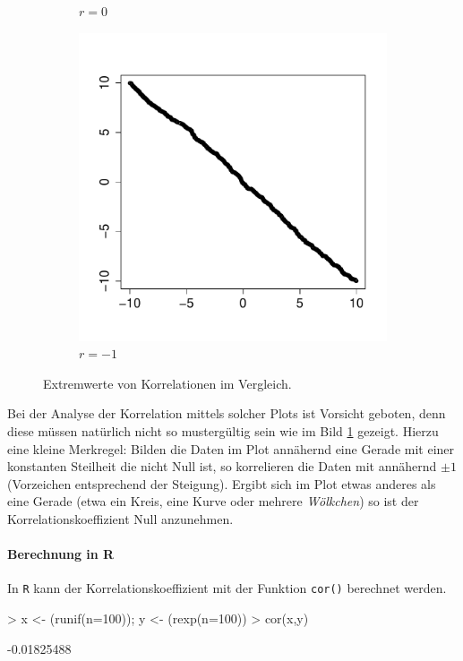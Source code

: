 \begin{figure}[h!]
\begin{subfigure}[b]{0.3\textwidth}
\caption{$r=0$}
\end{subfigure}
\begin{subfigure}[b]{0.3\textwidth}
\includegraphics{begriffe-017}
\caption{$r=-1$}
\end{subfigure}
\caption{Extremwerte von Korrelationen im Vergleich.}
\label{fig:korrelation}
\end{figure}

\noindent
Bei der Analyse der Korrelation mittels solcher Plots ist Vorsicht
geboten, denn diese müssen natürlich nicht so mustergültig sein wie im 
Bild \ref{fig:korrelation} gezeigt. 
Hierzu eine kleine Merkregel: Bilden die
Daten im Plot annähernd eine Gerade mit
einer konstanten Steilheit die nicht Null ist, so korrelieren die Daten
mit annähernd $\pm1$ (Vorzeichen entsprechend der Steigung).
Ergibt sich im Plot etwas anderes als eine Gerade (etwa ein Kreis, eine
Kurve oder mehrere \emph{Wölkchen}) so ist der Korrelationskoeffizient
Null anzunehmen.

\paragraph{Berechnung in R}
In \lstinline{R} kann der Korrelationskoeffizient mit der Funktion
\lstinline{cor()} berechnet werden.

\begin{Schunk}
\begin{Sinput}
> x <- (runif(n=100)); y <- (rexp(n=100))
> cor(x,y)
\end{Sinput}
\begin{Soutput}
[1] -0.01825488
\end{Soutput}
\end{Schunk}
